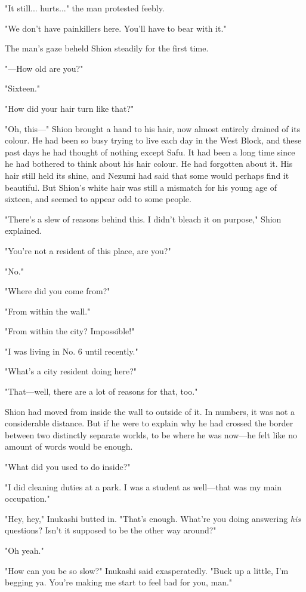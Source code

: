 "It still... hurts..." the man protested feebly.

"We don't have painkillers here. You'll have to bear with it."

The man's gaze beheld Shion steadily for the first time.

"---How old are you?"

"Sixteen."

"How did your hair turn like that?"

"Oh, this---" Shion brought a hand to his hair, now almost entirely
drained of its colour. He had been so busy trying to live each day in
the West Block, and these past days he had thought of nothing except
Safu. It had been a long time since he had bothered to think about his
hair colour. He had forgotten about it. His hair still held its shine,
and Nezumi had said that some would perhaps find it beautiful. But
Shion's white hair was still a mismatch for his young age of sixteen,
and seemed to appear odd to some people.

"There's a slew of reasons behind this. I didn't bleach it on purpose,"
Shion explained.

"You're not a resident of this place, are you?"

"No."

"Where did you come from?"

"From within the wall."

"From within the city? Impossible!"

"I was living in No. 6 until recently."

"What's a city resident doing here?"

"That---well, there are a lot of reasons for that, too."

Shion had moved from inside the wall to outside of it. In numbers, it
was not a considerable distance. But if he were to explain why he had
crossed the border between two distinctly separate worlds, to be where
he was now---he felt like no amount of words would be enough.

"What did you used to do inside?"

"I did cleaning duties at a park. I was a student as well---that was my
main occupation."

"Hey, hey," Inukashi butted in. "That's enough. What're you doing
answering \emph{his} questions? Isn't it supposed to be the other way around?"

"Oh yeah."

"How can you be so slow?" Inukashi said exasperatedly. "Buck up a
little, I'm begging ya. You're making me start to feel bad for you,
man."

